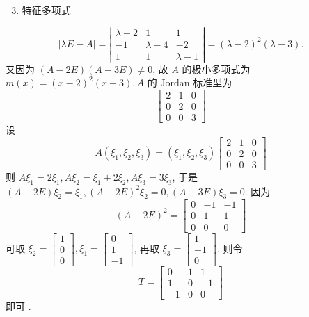 \documentclass[10pt]{article}
\begin{document}
\begin{enumerate}
  \setcounter{enumi}{2}
  \item  特征多项式 
\end{enumerate}
$$
|\lambda E-A|=\left|\begin{array}{ccc}
\lambda-2 & 1 & 1 \\
-1 & \lambda-4 & -2 \\
1 & 1 & \lambda-1
\end{array}\right|=(\lambda-2)^{2}(\lambda-3) .
$$
 又因为  $(A-2 E)(A-3 E) \neq 0$,  故  $A$  的极小多项式为  $m(x)=(x-2)^{2}(x-3), A$  的  Jordan  标准型为 
$$
\left[\begin{array}{lll}
2 & 1 & 0 \\
0 & 2 & 0 \\
0 & 0 & 3
\end{array}\right]
$$
 设 
$$
A\left(\xi_{1}, \xi_{2}, \xi_{3}\right)=\left(\xi_{1}, \xi_{2}, \xi_{3}\right)\left[\begin{array}{ccc}
2 & 1 & 0 \\
0 & 2 & 0 \\
0 & 0 & 3
\end{array}\right]
$$
 则  $A \xi_{1}=2 \xi_{1}, A \xi_{2}=\xi_{1}+2 \xi_{2}, A \xi_{3}=3 \xi_{3}$,  于是  $(A-2 E) \xi_{2}=\xi_{1},(A-2 E)^{2} \xi_{2}=0,(A-3 E) \xi_{3}=0$.  因为 
$$
(A-2 E)^{2}=\left[\begin{array}{rrr}
0 & -1 & -1 \\
0 & 1 & 1 \\
0 & 0 & 0
\end{array}\right]
$$
 可取  $\xi_{2}=\left[\begin{array}{l}1 \\ 0 \\ 0\end{array}\right], \xi_{1}=\left[\begin{array}{r}0 \\ 1 \\ -1\end{array}\right]$,  再取  $\xi_{3}=\left[\begin{array}{r}1 \\ -1 \\ 0\end{array}\right]$,  则令 
$$
T=\left[\begin{array}{rrr}
0 & 1 & 1 \\
1 & 0 & -1 \\
-1 & 0 & 0
\end{array}\right]
$$
 即可 .
\end{document}
